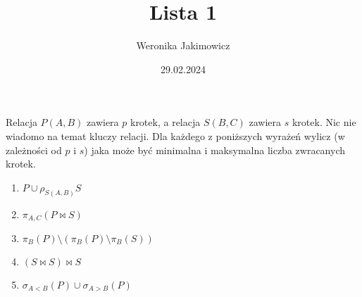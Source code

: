 \documentclass{article}
\title{Lista 1}
\author{Weronika Jakimowicz}
\date{29.02.2024}
\begin{document}
\maketitle 

\begin{problem}
  Relacja $P(A, B)$ zawiera $p$ krotek, a relacja $S(B, C)$ zawiera $s$ krotek. Nic nie wiadomo na temat kluczy relacji. Dla każdego z poniższych wyrażeń wylicz (w zależności od $p$ i $s$) jaka może być minimalna i maksymalna liczba zwracanych krotek.
  \begin{enumerate}[label=\alph*)]
    \item $P\cup \rho_{S(A, B)}S$
    \item $\pi_{A, C}(P\bowtie S)$
    \item $\pi_B(P)\setminus(\pi_B(P)\setminus \pi_B(S))$
    \item $(S\bowtie S)\bowtie S$
    \item $\sigma_{A<B}(P)\cup \sigma_{A>B}(P)$
  \end{enumerate}
\end{problem}
\end{document}
